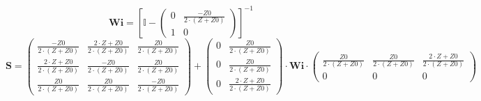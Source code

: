 \[ \mathbf{Wi} =  \left[ \mathbb{I}  - \left(\begin{smallmatrix} 0 &
\frac{-Z0}{2\cdot \left(Z+Z0\right)} \\ 1 & 0 \end{smallmatrix}\right)
\right]^{-1}  \]
\[ \mathbf{S} = \left(\begin{smallmatrix} \frac{-Z0}{2\cdot
\left(Z+Z0\right)} & \frac{2\cdot Z+Z0}{2\cdot \left(Z+Z0\right)} &
\frac{Z0}{2\cdot \left(Z+Z0\right)} \\ \frac{2\cdot Z+Z0}{2\cdot
\left(Z+Z0\right)} & \frac{-Z0}{2\cdot \left(Z+Z0\right)} &
\frac{Z0}{2\cdot \left(Z+Z0\right)} \\ \frac{Z0}{2\cdot
\left(Z+Z0\right)} & \frac{Z0}{2\cdot \left(Z+Z0\right)} &
\frac{-Z0}{2\cdot \left(Z+Z0\right)} \end{smallmatrix}\right) +
\left(\begin{smallmatrix} 0 & \frac{Z0}{2\cdot \left(Z+Z0\right)} \\ 0
& \frac{Z0}{2\cdot \left(Z+Z0\right)} \\ 0 & \frac{2\cdot Z+Z0}{2\cdot
\left(Z+Z0\right)} \end{smallmatrix}\right) \cdot \mathbf{Wi}
\cdot\left(\begin{smallmatrix} \frac{Z0}{2\cdot \left(Z+Z0\right)} &
\frac{Z0}{2\cdot \left(Z+Z0\right)} & \frac{2\cdot Z+Z0}{2\cdot
\left(Z+Z0\right)} \\ 0 & 0 & 0 \end{smallmatrix}\right) \]

